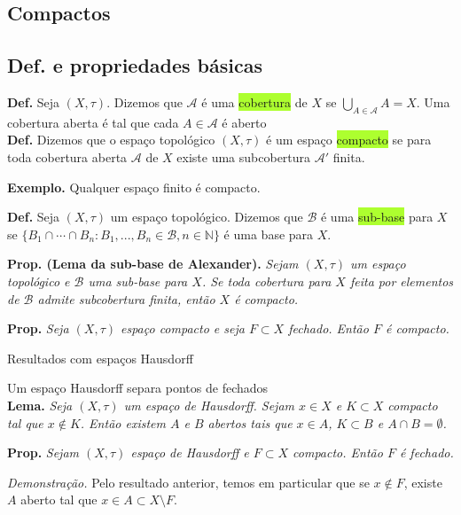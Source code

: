 \documentclass{article}
\begin{document}
\begin{landscape}
\begin{center}
\section{Compactos}
    
\end{center}
\begin{multicols}{3}
\subsection{Def. e propriedades básicas}
\textbf{Def.} Seja $(X, \tau)$. Dizemos que $\mathcal{A}$ é uma \colorbox{GreenYellow}{cobertura} de $X$ se $\bigcup_{A \in \mathcal{A}} A = X$. Uma cobertura aberta é tal que cada $A \in \mathcal{A}$ é aberto\\

\textbf{Def.} Dizemos que o espaço topológico $(X, \tau)$ é um espaço \colorbox{GreenYellow}{compacto} se para toda cobertura aberta $\mathcal{A}$ de $X$ existe uma subcobertura $\mathcal{A}'$  finita.\medskip

\textbf{Exemplo.} Qualquer espaço finito é compacto.\medskip

\textbf{Def.} Seja $(X, \tau)$ um espaço topológico. Dizemos que $\mathcal{B}$ é uma \colorbox{GreenYellow}{sub-base} para $X$ se $\{B_1 \cap \cdots \cap B_n : B_1, ..., B_n \in \mathcal{B}, n \in \mathbb{N}\}$ é uma base para $X$.\medskip

\textbf{Prop. (Lema da sub-base de Alexander).} \textit{Sejam $(X, \tau)$ um espaço topológico e $\mathcal{B}$ uma sub-base para $X$. Se toda cobertura para $X$ feita por elementos de $\mathcal{B}$ admite subcobertura finita, então $X$ é compacto.}\medskip

\textbf{Prop.} \textit{Seja $(X, \tau)$ espaço compacto e seja $F \subset X$ fechado. Então $F$ é compacto.}\medskip

\colorbox{cinza}{Resultados com espaços Hausdorff}\medskip

\color{blue!70}Um espaço Hausdorff separa pontos de fechados\\
\color{black}
\textbf{Lema. } \textit{Seja \((X, \tau)\) um espaço de Hausdorff. Sejam \(x \in X\) e \(K \subset X\) compacto tal que \(x \notin K\). Então existem \(A\) e \(B\) abertos tais que \(x \in A\), \(K \subset B\) e \(A \cap B = \emptyset\).}\medskip

\textbf{Prop. } \textit{Sejam \((X, \tau)\) espaço de Hausdorff e \(F \subset X\) compacto. Então \(F\) é fechado.}\medskip

\textit{Demonstração.} Pelo resultado anterior, temos em particular que se \(x \notin F\), existe \(A\) aberto tal que \(x \in A \subset X \setminus F\).  \medskip


\end{multicols}
\end{landscape}
\end{document}
